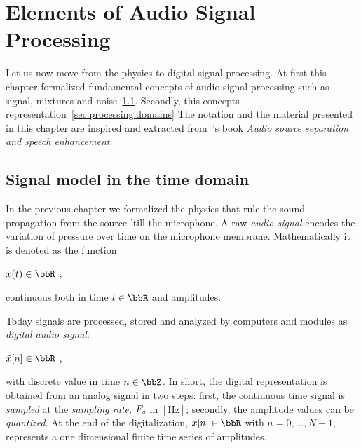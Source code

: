 \chapter{Elements of Audio Signal Processing}\label{ch:processing}
\vspace{-2.5em}
 Let us now move from the physics to digital signal processing.
At first this chapter formalized fundamental concepts of audio signal processing such as signal, mixtures and noise~\cref{sec:processing:model}.
Secondly, this concepts representation~\cref{sec:processing:domains}
The notation and the material presented in this chapter are inspired and extracted from~\citeauthor{vincent2018audio}'s book \textit{Audio source separation and speech enhancement}.

\section{Signal model in the time domain}\label{sec:processing:model}
In the previous chapter we formalized the physics that rule the sound propagation from the source 'till the microphone.
A raw \textit{audio signal} encodes the variation of pressure over time on the microphone membrane.
Mathematically it is denoted as the function
\begin{center}
    $\contTime{\mic}\in\bbR$
    ,
\end{center}
continuous both in time $t \in \R$ and amplitudes.

Today signals are processed, stored and analyzed by computers and modules as \textit{digital audio signal}:
\begin{center}
    $\discTime{\mic}\in\bbR$
    ,
\end{center}
with discrete value in time $n \in \Z$.
In short, the digital representation is obtained from an analog signal in two steps:
first, the continuous time signal is \textit{sampled}
at the \textit{sampling rate},  $F_s$ in $[\si{\Hz}]$;
secondly, the amplitude values can be \textit{quantized}.
At the end of the digitalization, $x[n] \in \R$ with $n = 0, \dots, N-1$, represents a one dimensional finite time series of amplitudes.

